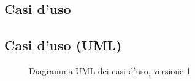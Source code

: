 \subsection{Casi d'uso}





\subsection{Casi d'uso (UML)}
\begin{figure}[h]
    \centering
    \caption{Diagramma UML dei casi d'uso, versione 1}
    \label{fig:use_case_uml_v1}
\end{figure}